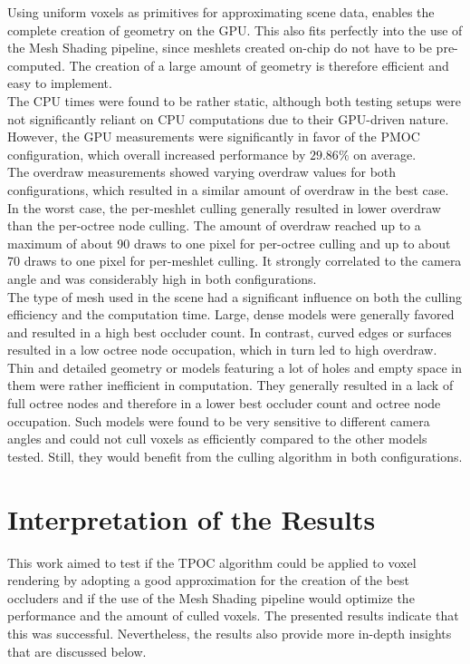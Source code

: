 \noindent
Using uniform voxels as primitives for approximating scene data, enables the complete creation of geometry on the 
\ac{GPU}. This also fits perfectly into the use of the Mesh Shading pipeline, since meshlets created on-chip do 
not have to be pre-computed. The creation of a large amount of geometry is therefore efficient and easy to 
implement. \\

\noindent
The \ac{CPU} times were found to be rather static, although both testing setups were not significantly reliant 
on \ac{CPU} computations due to their \ac{GPU}-driven nature. However, the \ac{GPU} measurements were significantly 
in favor of the \ac{PMOC} configuration, which overall increased performance by $29.86\%$ on 
average. \\

\noindent
The overdraw measurements showed varying overdraw values for both configurations, which resulted in a similar amount 
of overdraw in the best case. In the worst case, the per-meshlet culling generally resulted in lower overdraw than 
the per-octree node culling. The amount of overdraw reached up to a maximum of about 90 draws to one pixel for 
per-octree culling and up to about 70 draws to one pixel for per-meshlet culling. It strongly correlated to the 
camera angle and was considerably high in both configurations. \\ 

\noindent
The type of mesh used in the scene had a significant influence on both the culling efficiency and the computation time.
Large, dense models were generally favored and resulted in a high best occluder count. In contrast, curved edges or 
surfaces resulted in a low octree node occupation, which in turn led to high overdraw. Thin and detailed geometry or 
models featuring a lot of holes and empty space in them were rather inefficient in computation. They generally resulted 
in a lack of full octree nodes and therefore in a lower best occluder count and octree node occupation. Such models 
were found to be very sensitive to different camera angles and could not cull voxels as efficiently compared to the 
other models tested. Still, they would benefit from the culling algorithm in both configurations.

\section{Interpretation of the Results}

This work aimed to test if the \ac{TPOC} algorithm could be applied to voxel rendering by adopting a good approximation 
for the creation of the best occluders and if the use of the Mesh Shading pipeline would optimize the performance and 
the amount of culled voxels. The presented results indicate that this was successful. Nevertheless, the results also 
provide more in-depth insights that are discussed below. \\

